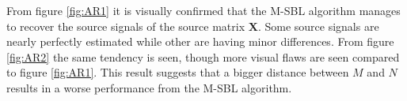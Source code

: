 \noindent
From figure \ref{fig:AR1} it is visually confirmed that the M-SBL algorithm manages to recover the source signals of the source matrix $\mathbf{X}$. 
Some source signals are nearly perfectly estimated while other are having minor differences. 
From figure \ref{fig:AR2} the same tendency is seen, though more visual flaws are seen compared to figure \ref{fig:AR1}. 
This result suggests that a bigger distance between $M$ and $N$ results in a worse performance from the M-SBL algorithm.        

% 






 
